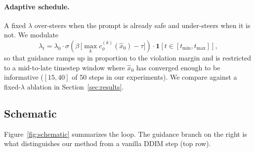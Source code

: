 \documentclass{article}
\begin{document}
\paragraph{Adaptive schedule.} A fixed $\lambda$ over-steers when the prompt is already safe and under-steers when it is not. We modulate
\begin{equation}
\lambda_t = \lambda_0 \cdot \sigma\!\left(\beta\,\bigl[\max_k c_\phi^{(k)}(\hat{x}_0) - \tau\bigr]\right) \cdot \mathbf{1}[t \in [t_{\min}, t_{\max}]],
\label{eq:adaptive}
\end{equation}
so that guidance ramps up in proportion to the violation margin and is restricted to a mid-to-late timestep window where $\hat{x}_0$ has converged enough to be informative ($[15, 40]$ of 50 steps in our experiments). We compare against a fixed-$\lambda$ ablation in Section~\ref{sec:results}.

\subsection{Schematic}

Figure~\ref{fig:schematic} summarizes the loop. The guidance branch on the right is what distinguishes our method from a vanilla DDIM step (top row).
\end{document}
